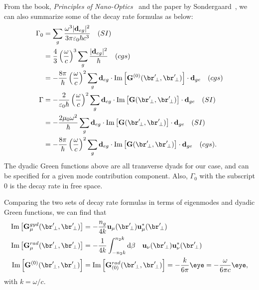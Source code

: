 \documentclass[preprint,aps,pra,onecolumn]{revtex4-1}
\begin{document}
From the book, \textit{Principles of Nano-Optics}~\cite{Novotny2012} and the paper by 
Sondergaard~\cite{Sondergaard2001}, we can also summarize some of the decay rate formulas as below:
\begin{align}
\Gamma_0 &= \sum_g \frac{\omega^3 |\mathbf{d}_{eg}|^2}{3\pi\varepsilon_0\hbar c^3} \quad (SI)\\
&= \frac{4}{3} \left(\frac{\omega}{c} \right)^3 \sum_g  \frac{|\mathbf{d}_{eg}|^2}{\hbar}\quad (cgs)\\
&= - \frac{8\pi}{\hbar} \left( \frac{\omega}{c}\right)^2\sum_g \mathbf{d}_{eg} \cdot \mathrm{Im} 
\left[ \mathbf{G}^{(0)} (\br^\prime\!_\perp,\br^\prime\!_\perp)\right]\cdot \mathbf{d}_{ge} \quad (cgs)\\
\Gamma &= - \frac{2}{\varepsilon_0\hbar} \left( \frac{\omega}{c}\right)^2\sum_g \mathbf{d}_{eg} \cdot 
\mathrm{Im} \left[
\mathbf{G} (\br^\prime\!_\perp,\br^\prime\!_\perp)\right] \cdot \mathbf{d}_{ge} \quad (SI)\\
&=  - \frac{2\mu_0\omega^2}{\hbar} \sum_g  \mathbf{d}_{eg} \cdot \mathrm{Im} \left[ 
\mathbf{G} (\br^\prime\!_\perp,\br^\prime\!_\perp)\right]\cdot \mathbf{d}_{ge} \quad (SI)\\
&= - \frac{8\pi}{\hbar} \left( \frac{\omega}{c}\right)^2\sum_g \mathbf{d}_{eg} \cdot \mathrm{Im} 
\left[ \mathbf{G} (\br^\prime\!_\perp,\br^\prime\!_\perp)\right]\cdot \mathbf{d}_{ge} \quad (cgs).
\end{align}
The dyadic Green functions above are all transverse dyads for our case, and can be specified for a given 
mode contribution component.  Also, $ \Gamma_0 $ with the subscript $ 0 $ is the decay rate in free 
space. 

Comparing the two sets of decay 
rate formulas in terms of eigenmodes and dyadic Green functions, we can find that 
\begin{align}
\mathrm{Im}\left[ \mathbf{G}^{gyd}_\mu (\br^\prime\!_\perp, \br^\prime\!_\perp) \right] &= 
-\frac{n_g}{4k} \mathbf{u}_{\mu}(\br^\prime\!_\perp) \mathbf{u}_{\mu}^* 
(\br^\prime\!_\perp)\label{eq:Ggydmu} \\
\mathrm{Im}\left[ \mathbf{G}^{rad}_\mu (\br^\prime\!_\perp, \br^\prime\!_\perp) \right] &= 
-\frac{1}{4k}  \int_{-n_2 k }^{n_2 k}\mathrm{d}\beta \quad 
\mathbf{u}_{\nu}(\br^\prime\!_\perp) \mathbf{u}_{\nu}^* (\br^\prime\!_\perp)\\
\mathrm{Im}\left[ \mathbf{G}^{(0)} (\br^\prime\!_\perp, \br^\prime\!_\perp) \right] &= \mathrm{Im} 
\left[ \mathbf{G}^{rad}_{(0)}(\br'\!_\perp,\br'\!_\perp)\right]  = -\frac{ 
k}{6\pi}\eye = -\frac{ 
\omega}{6\pi c}\eye,\label{eq:G0}
\end{align}
with $ k=\omega/c $. 
\end{document}
